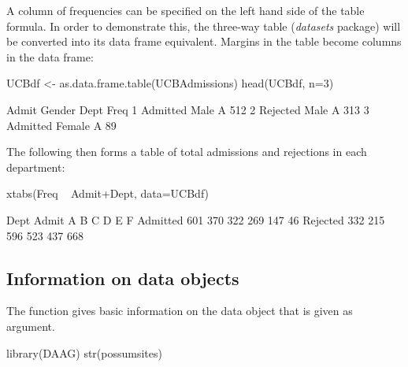 A column of frequencies can be specified on the left hand side of the
table formula. In order to demonstrate this, the three-way table
 ({\em datasets} package) will be converted into
its data frame equivalent.  Margins in the table become columns in
the data frame:
\begin{Schunk}
\begin{Sinput}
UCBdf <- as.data.frame.table(UCBAdmissions)
head(UCBdf, n=3)
\end{Sinput}
\begin{Soutput}
     Admit Gender Dept Freq
1 Admitted   Male    A  512
2 Rejected   Male    A  313
3 Admitted Female    A   89
\end{Soutput}
\end{Schunk}

The following then forms a table of total admissions and rejections
in each department:
\begin{Schunk}
\begin{Sinput}
xtabs(Freq ~  Admit+Dept, data=UCBdf)
\end{Sinput}
\begin{Soutput}
          Dept
Admit        A   B   C   D   E   F
  Admitted 601 370 322 269 147  46
  Rejected 332 215 596 523 437 668
\end{Soutput}
\end{Schunk}


\subsection*{Information on data objects}

The function  gives basic information on the data object that
is given as argument.
\begin{Schunk}
\begin{Sinput}
library(DAAG)
str(possumsites)
\end{Sinput}
\end{Schunk}

